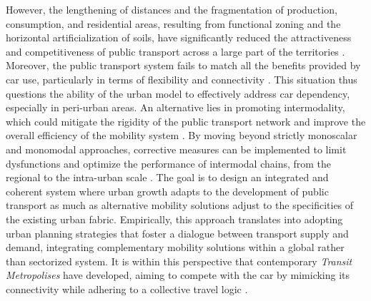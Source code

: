 \begin{refsegment}
However, the lengthening of distances and the fragmentation of production, consumption, and residential areas, resulting from functional zoning and the horizontal artificialization of soils, have significantly reduced the attractiveness and competitiveness of public transport across a large part of the territories \textcolor{blue}{\autocite[25-28]{mallet_voyage_2022}}. Moreover, the public transport system fails to match all the benefits provided by car use, particularly in terms of flexibility and connectivity \textcolor{blue}{\autocite[209]{heran_retour_2015}}. This situation thus questions the ability of the urban model to effectively address car dependency, especially in peri-urban areas. An alternative lies in promoting intermodality, which could mitigate the rigidity of the public transport network \textcolor{blue}{\autocite[17]{wiel_comment_1998}} and improve the overall efficiency of the mobility system \textcolor{blue}{\autocite[82]{oostendorp_combining_2018}}. By moving beyond strictly monoscalar and monomodal approaches, corrective measures can be implemented to limit dysfunctions and optimize the performance of intermodal chains, from the regional to the intra-urban scale \textcolor{blue}{\autocite[111-115]{chapelon_transports_2016}}. The goal is to design an integrated and coherent system where urban growth adapts to the development of public transport as much as alternative mobility solutions adjust to the specificities of the existing urban fabric. Empirically, this approach translates into adopting urban planning strategies that foster a dialogue between transport supply and demand, integrating complementary mobility solutions within a global rather than sectorized system. It is within this perspective that contemporary \textsl{Transit Metropolises} have developed, aiming to compete with the car by mimicking its  connectivity while adhering to a collective travel logic \textcolor{blue}{\autocite[132-133]{cervero_transit_2020}}.%


\end{refsegment}
